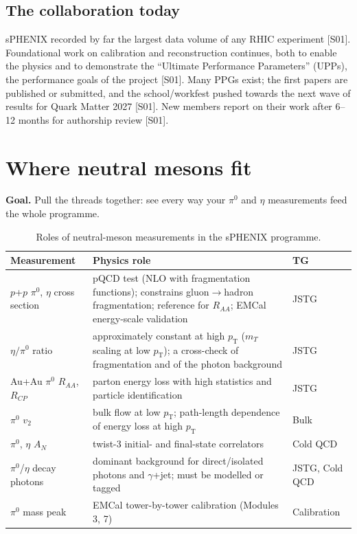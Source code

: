 \documentclass[11pt,letterpaper]{article}
\newcommand{\goal}[1]{\noindent\textbf{Goal.} #1\par}
\newcommand{\pT}{p_{\mathrm{T}}}
\newcommand{\RAA}{R_{AA}}
\begin{document}
\subsection{The collaboration today}
sPHENIX recorded by far the largest data volume of any RHIC experiment [S01]. Foundational work on calibration and
reconstruction continues, both to enable the physics and to demonstrate the ``Ultimate Performance Parameters'' (UPPs),
the performance goals of the project [S01]. Many PPGs exist; the first papers are published or submitted, and the
school/workfest pushed towards the next wave of results for Quark Matter 2027 [S01]. New members report on their work after
6--12 months for authorship review [S01].

\section{Where neutral mesons fit}\label{sec:neutral}
\goal{Pull the threads together: see every way your $\pi^0$ and $\eta$ measurements feed the whole programme.}

\begin{table}[h]\centering\small
\begin{tabularx}{\linewidth}{@{}lXl@{}}\toprule
Measurement & Physics role & TG\\\midrule
$p$+$p$ $\pi^0$, $\eta$ cross section & pQCD test (NLO with fragmentation functions); constrains gluon$\to$hadron fragmentation;
reference for $\RAA$; EMCal energy-scale validation & JSTG\\
$\eta/\pi^0$ ratio & approximately constant at high $\pT$ ($m_T$ scaling at low $\pT$); a cross-check of fragmentation and of the photon background & JSTG\\
Au+Au $\pi^0$ $\RAA$, $R_{CP}$ & parton energy loss with high statistics and particle identification & JSTG\\
$\pi^0$ $v_2$ & bulk flow at low $\pT$; path-length dependence of energy loss at high $\pT$ & Bulk\\
$\pi^0$, $\eta$ $A_N$ & twist-3 initial- and final-state correlators & Cold QCD\\
$\pi^0$/$\eta$ decay photons & dominant background for direct/isolated photons and $\gamma$+jet; must be modelled or tagged & JSTG, Cold QCD\\
$\pi^0$ mass peak & EMCal tower-by-tower calibration (Modules 3, 7) & Calibration\\
\bottomrule\end{tabularx}
\caption{Roles of neutral-meson measurements in the sPHENIX programme.}
\end{table}
\end{document}
